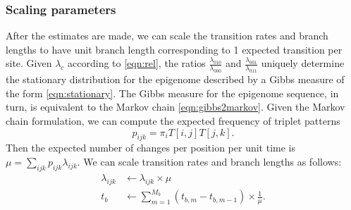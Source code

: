 \documentclass[11pt]{article}
\begin{document}
\subsubsection{Scaling parameters}
After the estimates are made, we can scale the transition rates and
branch lengths to have unit branch length corresponding to 1 expected
transition per site.  Given $\lambda_{c}$ according to
\eqref{eqn:rel}, the ratios $\frac{\lambda_{010}}{\lambda_{000}}$ and
$\frac{\lambda_{001}}{\lambda_{011}}$ uniquely determine the
stationary distribution for the epigenome described by a Gibbs measure
of the form \eqref{eqn:stationary}. The Gibbs measure for the
epigenome sequence, in turn, is equivalent to the Markov chain
\eqref{eqn:gibbs2markov}. Given the Markov chain formulation, we can
compute the expected frequency of triplet patterns
\[
p_{ijk} = \pi_i T[i,j] T[j,k].
\]
Then the expected number of changes per position per
unit time is $\mu = \sum_{ijk}p_{ijk}\lambda_{ijk}$. We can scale transition
rates and branch lengths as follows:
\begin{equation}\label{eqn:tidentifiable}
\begin{aligned}
\lambda_{ijk} &\leftarrow \lambda_{ijk}\times \mu \\
t_b &\leftarrow \sum\limits_{m=1}^{M_b} (t_{b,m} - t_{b,m-1}) \times \frac{1}{\mu}.
\end{aligned}
\end{equation}
\end{document}

